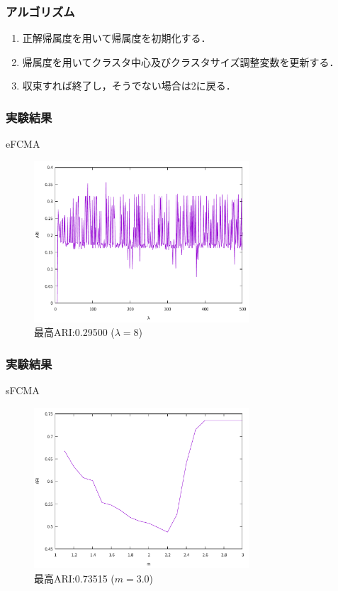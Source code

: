 \documentclass[13pt,dvipdfmx]{beamer}
\begin{document}
\begin{frame}\frametitle{アルゴリズム}
  \begin{enumerate}
  \item 正解帰属度を用いて帰属度を初期化する．
  \item 帰属度を用いてクラスタ中心及びクラスタサイズ調整変数を更新する．
  \item 収束すれば終了し，そうでない場合は$2$に戻る．
  \end{enumerate}
\end{frame}

\begin{frame}\frametitle{実験結果}
  \begin{block}{eFCMA}
    \begin{figure}[htbp]
      \begin{center}
        \includegraphics[height=60mm]{eFCMA_ARI.pdf}
      \end{center}
      \captionsetup{labelformat=empty,labelsep=none}
      \caption{最高ARI:0.29500 ($\lambda=8$)}
    \end{figure}
  \end{block}
\end{frame}

\begin{frame}\frametitle{実験結果}
  \begin{block}{sFCMA}
    \begin{figure}[htbp]
      \begin{center}
        \includegraphics[height=60mm]{sFCMA_ARI.pdf}
      \end{center}
      \captionsetup{labelformat=empty,labelsep=none}
      \caption{最高ARI:0.73515 ($m=3.0$)}
    \end{figure}
  \end{block}
\end{frame}
\end{document}
